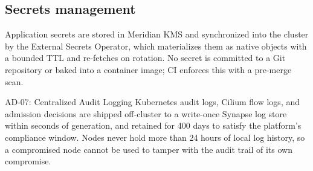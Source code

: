 \subsection{Secrets management}
Application secrets are stored in Meridian KMS and synchronized into the cluster by the External Secrets Operator, which materializes them as native  objects with a bounded TTL and re-fetches on rotation. No secret is committed to a Git repository or baked into a container image; CI enforces this with a pre-merge scan.

\begin{specbox}{AD-07: Centralized Audit Logging}
Kubernetes audit logs, Cilium flow logs, and admission decisions are shipped off-cluster to a write-once Synapse log store within seconds of generation, and retained for 400 days to satisfy the platform's compliance window. Nodes never hold more than 24 hours of local log history, so a compromised node cannot be used to tamper with the audit trail of its own compromise.
\end{specbox}
